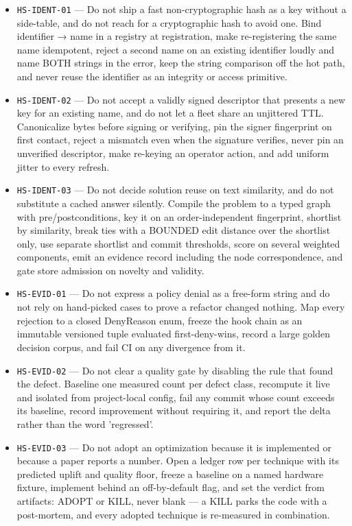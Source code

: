 \documentclass[11pt]{article}
\begin{document}
\begin{itemize}
  \item \texttt{HS-IDENT-01} --- Do not ship a fast non-cryptographic hash as a key without a side-table, and do not reach for a cryptographic hash to avoid one. Bind identifier → name in a registry at registration, make re-registering the same name idempotent, reject a second name on an existing identifier loudly and name BOTH strings in the error, keep the string comparison off the hot path, and never reuse the identifier as an integrity or access primitive. %
  \item \texttt{HS-IDENT-02} --- Do not accept a validly signed descriptor that presents a new key for an existing name, and do not let a fleet share an unjittered TTL. Canonicalize bytes before signing or verifying, pin the signer fingerprint on first contact, reject a mismatch even when the signature verifies, never pin an unverified descriptor, make re-keying an operator action, and add uniform jitter to every refresh. %
  \item \texttt{HS-IDENT-03} --- Do not decide solution reuse on text similarity, and do not substitute a cached answer silently. Compile the problem to a typed graph with pre/postconditions, key it on an order-independent fingerprint, shortlist by similarity, break ties with a BOUNDED edit distance over the shortlist only, use separate shortlist and commit thresholds, score on several weighted components, emit an evidence record including the node correspondence, and gate store admission on novelty and validity. %
  \item \texttt{HS-EVID-01} --- Do not express a policy denial as a free-form string and do not rely on hand-picked cases to prove a refactor changed nothing. Map every rejection to a closed DenyReason enum, freeze the hook chain as an immutable versioned tuple evaluated first-deny-wins, record a large golden decision corpus, and fail CI on any divergence from it. %
  \item \texttt{HS-EVID-02} --- Do not clear a quality gate by disabling the rule that found the defect. Baseline one measured count per defect class, recompute it live and isolated from project-local config, fail any commit whose count exceeds its baseline, record improvement without requiring it, and report the delta rather than the word 'regressed'. %
  \item \texttt{HS-EVID-03} --- Do not adopt an optimization because it is implemented or because a paper reports a number. Open a ledger row per technique with its predicted uplift and quality floor, freeze a baseline on a named hardware fixture, implement behind an off-by-default flag, and set the verdict from artifacts: ADOPT or KILL, never blank — a KILL parks the code with a post-mortem, and every adopted technique is re-measured in combination. %

\end{itemize}
\end{document}
